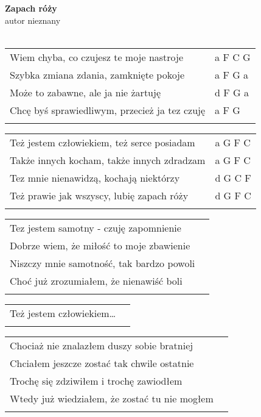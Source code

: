 \documentclass[a5paper]{article}
\begin{document}


\noindent
\fontsize{12pt}{15pt}\selectfont
\textbf{Zapach róży} \\
\fontsize{8pt}{10pt}\selectfont
autor nieznany \\ \\
\fontsize{10pt}{12pt}\selectfont
{}
\begin{tabular}{@{}p{8.50cm}p{3cm}@{}}
\noindent
Wiem chyba, co czujesz te moje nastroje & a F C G \\
Szybka zmiana zdania, zamknięte pokoje & a F G a \\
Może to zabawne, ale ja nie żartuję & d F G a \\
Chcę byś sprawiedliwym, przecież ja tez czuję & a F G \\ \\
\end{tabular}

\noindent
\begin{tabular}{@{}p{7.50cm}p{3cm}@{}}
Też jestem człowiekiem, też serce posiadam & a G F C \\
Także innych kocham, także innych zdradzam & a G F C \\
Tez mnie nienawidzą, kochają niektórzy & d G C F \\
Też prawie jak wszyscy, lubię zapach róży & d G F C \\ \\
\end{tabular}

\noindent
\begin{tabular}{@{}p{7.50cm}p{3cm}@{}}
Tez jestem samotny - czuję zapomnienie \\
Dobrze wiem, że miłość to moje zbawienie \\
Niszczy mnie samotność, tak bardzo powoli \\
Choć już zrozumiałem, że nienawiść boli \\ \\
\end{tabular}

\noindent
\begin{tabular}{@{}p{7.50cm}p{3cm}@{}}
Też jestem człowiekiem… \\ \\
\end{tabular}

\noindent
\begin{tabular}{@{}p{7.50cm}p{3cm}@{}}
Chociaż nie znalazłem duszy sobie bratniej \\
Chciałem jeszcze zostać tak chwile ostatnie \\
Trochę się zdziwiłem i trochę zawiodłem \\
Wtedy już wiedziałem, że zostać tu nie mogłem \\ \\
\end{tabular}
\end{document}
